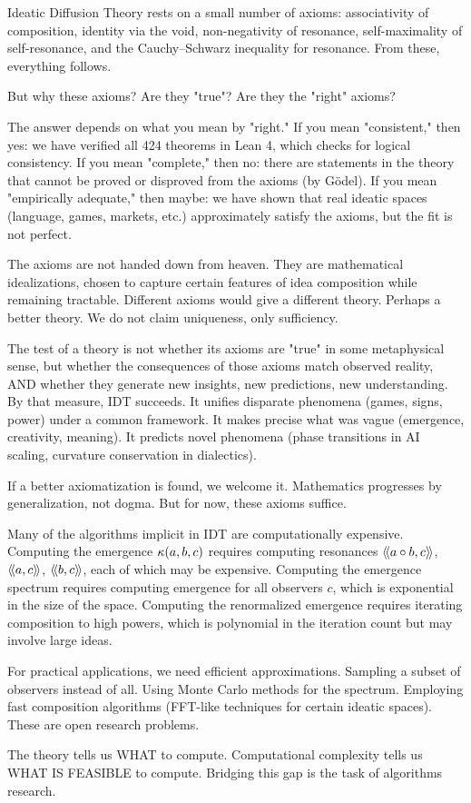 \begin{remark}
Ideatic Diffusion Theory rests on a small number of axioms: associativity of
composition, identity via the void, non-negativity of resonance, self-maximality
of self-resonance, and the Cauchy--Schwarz inequality for resonance. From these,
everything follows.

But why these axioms? Are they "true"? Are they the "right" axioms?

The answer depends on what you mean by "right." If you mean "consistent," then
yes: we have verified all 424 theorems in Lean 4, which checks for logical
consistency. If you mean "complete," then no: there are statements in the theory
that cannot be proved or disproved from the axioms (by Gödel). If you mean
"empirically adequate," then maybe: we have shown that real ideatic spaces
(language, games, markets, etc.) approximately satisfy the axioms, but the fit
is not perfect.

The axioms are not handed down from heaven. They are mathematical idealizations,
chosen to capture certain features of idea composition while remaining tractable.
Different axioms would give a different theory. Perhaps a better theory. We do
not claim uniqueness, only sufficiency.

The test of a theory is not whether its axioms are "true" in some metaphysical
sense, but whether the consequences of those axioms match observed reality, AND
whether they generate new insights, new predictions, new understanding. By that
measure, IDT succeeds. It unifies disparate phenomena (games, signs, power) under
a common framework. It makes precise what was vague (emergence, creativity,
meaning). It predicts novel phenomena (phase transitions in AI scaling, curvature
conservation in dialectics).

If a better axiomatization is found, we welcome it. Mathematics progresses by
generalization, not dogma. But for now, these axioms suffice.
\end{remark}

\begin{remark}
Many of the algorithms implicit in IDT are computationally expensive. Computing
the emergence $\kappa(a,b,c)$ requires computing resonances $\langle\!\langle a \circ b, c \rangle\!\rangle$,
$\langle\!\langle a, c \rangle\!\rangle$, $\langle\!\langle b, c \rangle\!\rangle$, each of which may be expensive. Computing the emergence
spectrum requires computing emergence for all observers $c$, which is exponential
in the size of the space. Computing the renormalized emergence requires iterating
composition to high powers, which is polynomial in the iteration count but may
involve large ideas.

For practical applications, we need efficient approximations. Sampling a subset
of observers instead of all. Using Monte Carlo methods for the spectrum. Employing
fast composition algorithms (FFT-like techniques for certain ideatic spaces).
These are open research problems.

The theory tells us WHAT to compute. Computational complexity tells us WHAT IS
FEASIBLE to compute. Bridging this gap is the task of algorithms research.
\end{remark}

